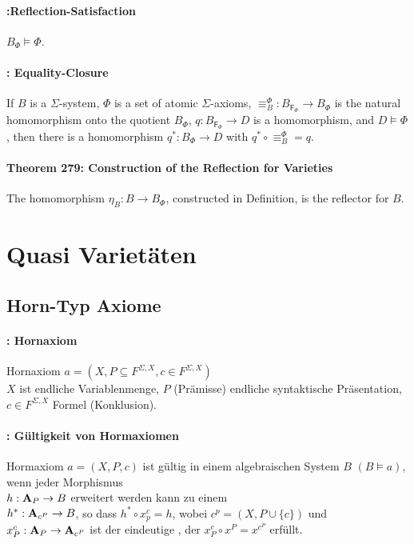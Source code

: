 \paragraph{:Reflection-Satisfaction}$B_{\Phi}\models\Phi$.

\paragraph{ : Equality-Closure}If $B$ is a $\Sigma$-system, $\Phi$
is a set of atomic $\Sigma$-axioms, $\equiv_{B}^{\Phi}:B_{\mathsf{F_{\Phi}}}\rightarrow B_{\Phi}$
is the natural homomorphism onto the quotient $B_{\Phi}$, $q:B_{\mathsf{F_{\Phi}}}\rightarrow D$
is a homomorphism, and $D\models\Phi$, then there is a homomorphism
$q^{*}:B_{\Phi}\rightarrow D$ with $q^{*}\circ\equiv_{B}^{\Phi}=q$.

\paragraph{Theorem 279: 
Construction of the Reflection for Varieties} The homomorphism $\eta_{B}:B\rightarrow B_{\Phi}$,
constructed in Definition, is the reflector for $B$.




\section{Quasi Varietäten}

\subsection{Horn-Typ Axiome}

\paragraph{: Hornaxiom}
Hornaxiom $a = (X, P \subseteq F^{\Sigma,X}, c \in F^{\Sigma,X})$ \\
$X$ ist endliche Variablenmenge, $P$ (Prämisse) endliche syntaktische Präsentation, $c \in F^{\Sigma,X}$ Formel (Konklusion).

\paragraph{: Gültigkeit von Hormaxiomen}
Hormaxiom $a = (X, P, c)$ ist gültig in einem algebraischen System $B$ $(B \models a)$, wenn jeder Morphismus \\ $h: \mathbf{A}_P \rightarrow B$ erweitert werden kann zu einem \homo \\ $h^*: \mathbf{A}_{c^P} \rightarrow B$, so dass $h^* \circ x_{p}^c = h$, wobei $c^p = (X,P \cup \{c\})$ und $x^{c}_P: \mathbf{A}_P \rightarrow \mathbf{A}_{c^P}$ ist der eindeutige \homo, der $x_P^c \circ x^P = x^{c^P}$ erfüllt.


